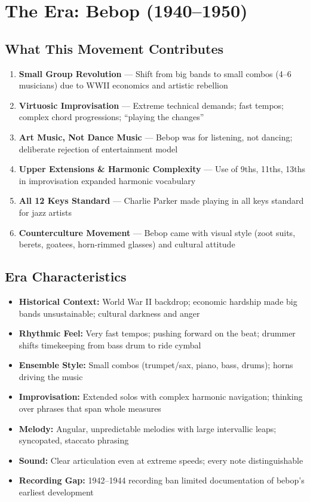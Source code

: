 \documentclass[11pt, letterpaper]{article}
\begin{document}
\newpage

\section{The Era: Bebop (1940--1950)}

\subsection{What This Movement Contributes}
\begin{enumerate}
    \item \textbf{Small Group Revolution} --- Shift from big bands to small combos (4--6 musicians) due to WWII economics and artistic rebellion
    \item \textbf{Virtuosic Improvisation} --- Extreme technical demands; fast tempos; complex chord progressions; ``playing the changes''
    \item \textbf{Art Music, Not Dance Music} --- Bebop was for listening, not dancing; deliberate rejection of entertainment model
    \item \textbf{Upper Extensions \& Harmonic Complexity} --- Use of 9ths, 11ths, 13ths in improvisation expanded harmonic vocabulary
    \item \textbf{All 12 Keys Standard} --- Charlie Parker made playing in all keys standard for jazz artists
    \item \textbf{Counterculture Movement} --- Bebop came with visual style (zoot suits, berets, goatees, horn-rimmed glasses) and cultural attitude
\end{enumerate}

\subsection{Era Characteristics}
\begin{itemize}
    \item \textbf{Historical Context:} World War II backdrop; economic hardship made big bands unsustainable; cultural darkness and anger
    \item \textbf{Rhythmic Feel:} Very fast tempos; pushing forward on the beat; drummer shifts timekeeping from bass drum to ride cymbal
    \item \textbf{Ensemble Style:} Small combos (trumpet/sax, piano, bass, drums); horns driving the music
    \item \textbf{Improvisation:} Extended solos with complex harmonic navigation; thinking over phrases that span whole measures
    \item \textbf{Melody:} Angular, unpredictable melodies with large intervallic leaps; syncopated, staccato phrasing
    \item \textbf{Sound:} Clear articulation even at extreme speeds; every note distinguishable
    \item \textbf{Recording Gap:} 1942--1944 recording ban limited documentation of bebop's earliest development
\end{itemize}
\end{document}
